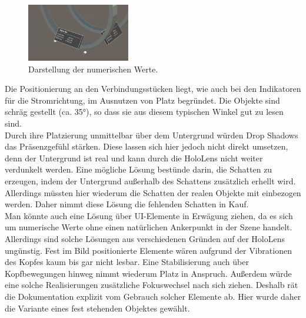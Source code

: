 \begin{figure}
	\centering
	\includegraphics[width=0.4\textwidth]{images/unity/status.jpg}
	\caption{Darstellung der numerischen Werte.}
	\label{img:status}
\end{figure}

Die Positionierung an den Verbindungsstücken liegt, wie auch bei den Indikatoren für die Stromrichtung, im Ausnutzen von Platz begründet. Die Objekte sind schräg gestellt (ca. 35°), so dass sie aus diesem typischen Winkel gut zu lesen sind.\\

Durch ihre Platzierung unmittelbar über dem Untergrund würden Drop Shadows das Präsenzgefühl stärken. Diese lassen sich hier jedoch nicht direkt umsetzen, denn der Untergrund ist real und kann durch die HoloLens nicht weiter verdunkelt werden. Eine mögliche Lösung bestünde darin, die Schatten zu erzeugen, indem der Untergrund außerhalb des Schattens zusätzlich erhellt wird. Allerdings müssten hier wiederum die Schatten der realen Objekte mit einbezogen werden. Daher nimmt diese Lösung die fehlenden Schatten in Kauf.\\

Man könnte auch eine Lösung über UI-Elemente in Erwägung ziehen, da es sich um numerische Werte ohne einen natürlichen Ankerpunkt in der Szene handelt. Allerdings sind solche Lösungen aus verschiedenen Gründen auf der HoloLens ungünstig. Fest im Bild positionierte Elemente wären aufgrund der Vibrationen des Kopfes kaum bis gar nicht lesbar. Eine Stabilisierung auch über Kopfbewegungen hinweg nimmt wiederum Platz in Anspruch. Außerdem würde eine solche Realisierungen zusätzliche Fokuswechsel nach sich ziehen. Deshalb rät die Dokumentation explizit vom Gebrauch solcher Elemente ab. Hier wurde daher die Variante eines fest stehenden Objektes gewählt.

